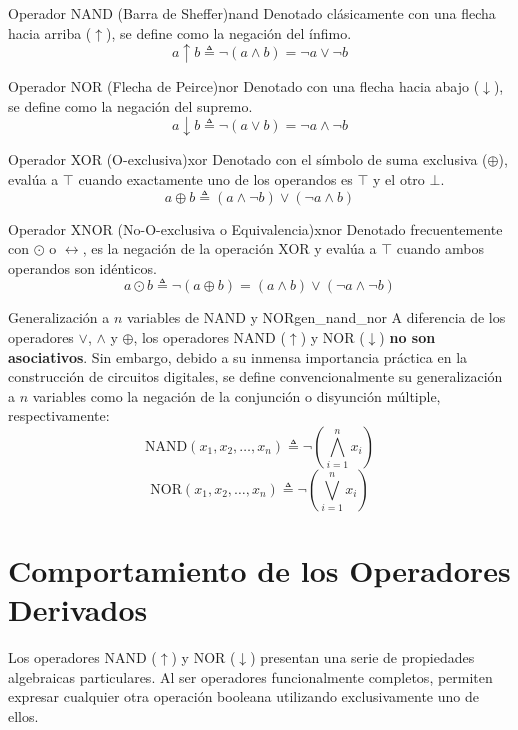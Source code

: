\documentclass[12pt,a4paper]{article}
\begin{document}
\begin{definicion}{Operador NAND (Barra de Sheffer)}{nand}
Denotado clásicamente con una flecha hacia arriba ($\uparrow$), se define como la negación del ínfimo.
\[ a \uparrow b \triangleq \neg (a \wedge b) = \neg a \vee \neg b \]
\end{definicion}

\begin{definicion}{Operador NOR (Flecha de Peirce)}{nor}
Denotado con una flecha hacia abajo ($\downarrow$), se define como la negación del supremo.
\[ a \downarrow b \triangleq \neg (a \vee b) = \neg a \wedge \neg b \]
\end{definicion}

\begin{definicion}{Operador XOR (O-exclusiva)}{xor}
Denotado con el símbolo de suma exclusiva ($\oplus$), evalúa a $\top$ cuando exactamente uno de los operandos es $\top$ y el otro $\bot$.
\[ a \oplus b \triangleq (a \wedge \neg b) \vee (\neg a \wedge b) \]
\end{definicion}

\begin{definicion}{Operador XNOR (No-O-exclusiva o Equivalencia)}{xnor}
Denotado frecuentemente con $\odot$ o $\leftrightarrow$, es la negación de la operación XOR y evalúa a $\top$ cuando ambos operandos son idénticos.
\[ a \odot b \triangleq \neg (a \oplus b) = (a \wedge b) \vee (\neg a \wedge \neg b) \]
\end{definicion}

\begin{definicion}{Generalización a $n$ variables de NAND y NOR}{gen_nand_nor}
A diferencia de los operadores $\vee$, $\wedge$ y $\oplus$, los operadores NAND ($\uparrow$) y NOR ($\downarrow$) \textbf{no son asociativos}. Sin embargo, debido a su inmensa importancia práctica en la construcción de circuitos digitales, se define convencionalmente su generalización a $n$ variables como la negación de la conjunción o disyunción múltiple, respectivamente:
\[ \text{NAND}(x_1, x_2, \dots, x_n) \triangleq \neg \left( \bigwedge_{i=1}^n x_i \right) \]
\[ \text{NOR}(x_1, x_2, \dots, x_n) \triangleq \neg \left( \bigvee_{i=1}^n x_i \right) \]
\end{definicion}

\section{Comportamiento de los Operadores Derivados}
Los operadores NAND ($\uparrow$) y NOR ($\downarrow$) presentan una serie de propiedades algebraicas particulares. Al ser operadores funcionalmente completos, permiten expresar cualquier otra operación booleana utilizando exclusivamente uno de ellos.
\end{document}
